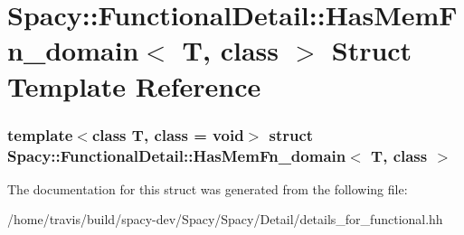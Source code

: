 \hypertarget{structSpacy_1_1FunctionalDetail_1_1HasMemFn__domain}{\section{\-Spacy\-:\-:\-Functional\-Detail\-:\-:\-Has\-Mem\-Fn\-\_\-domain$<$ \-T, class $>$ \-Struct \-Template \-Reference}
\label{structSpacy_1_1FunctionalDetail_1_1HasMemFn__domain}
}
\subsubsection*{template$<$class T, class = void$>$ struct Spacy\-::\-Functional\-Detail\-::\-Has\-Mem\-Fn\-\_\-domain$<$ T, class $>$}



\-The documentation for this struct was generated from the following file\-:\begin{DoxyCompactItemize}
\item 
/home/travis/build/spacy-\/dev/\-Spacy/\-Spacy/\-Detail/details\-\_\-for\-\_\-functional.\-hh\end{DoxyCompactItemize}
